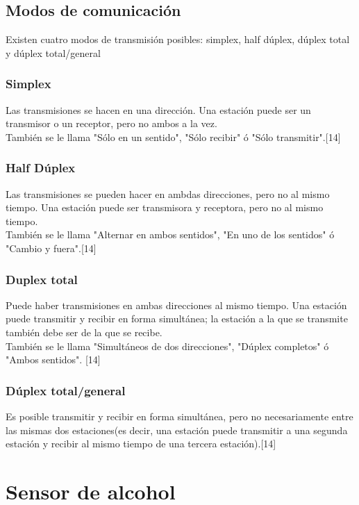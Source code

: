\section{Modos de comunicación}
Existen cuatro modos de transmisión posibles: simplex, half dúplex, dúplex total y dúplex total/general
\subsection{Simplex}
Las transmisiones se hacen en una dirección. Una estación puede ser un transmisor o un receptor, pero no ambos a la vez. \\
También se le llama "Sólo en un sentido", "Sólo recibir" ó "Sólo transmitir".[14]

\subsection{Half Dúplex}
Las transmisiones se pueden hacer en ambdas direcciones, pero no al mismo tiempo. Una estación puede ser transmisora y receptora, pero no al mismo tiempo. \\
También se le llama "Alternar en ambos sentidos", "En uno de los sentidos" ó "Cambio y fuera".[14]

\subsection{Duplex total}
Puede haber transmisiones en ambas direcciones al mismo tiempo. Una estación puede transmitir y recibir en forma simultánea; la estación a la que se transmite también debe ser de la que se recibe. \\
También se le llama "Simultáneos de dos direcciones", "Dúplex completos" ó "Ambos sentidos". [14]

\subsection{Dúplex total/general}
Es posible transmitir y recibir en forma simultánea, pero no necesariamente entre las mismas dos estaciones(es decir, una estación puede transmitir a una segunda estación y recibir al mismo tiempo de una tercera estación).[14]

\chapter{Sensor de alcohol}


